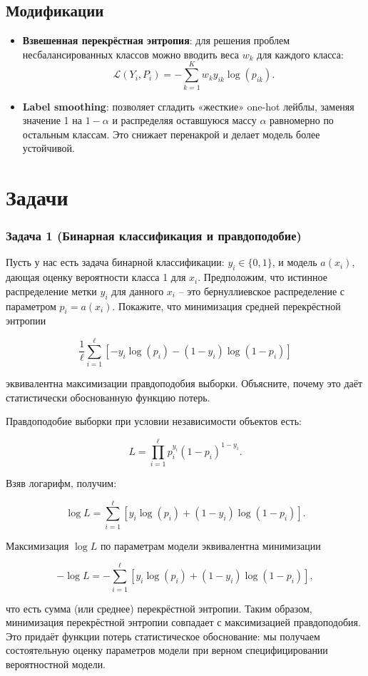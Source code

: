\subsection*{Модификации}

\begin{itemize}
    \item \textbf{Взвешенная перекрёстная энтропия}: для решения проблем несбалансированных классов можно вводить веса $w_k$ для каждого класса:
          $$
              \mathcal{L}(Y_i, P_i) = -\sum_{k=1}^{K} w_k y_{ik}\log(p_{ik}).
          $$

    \item \textbf{Label smoothing}: позволяет сгладить «жесткие» one-hot лейблы, заменяя значение 1 на $1-\alpha$ и распределяя оставшуюся массу $\alpha$ равномерно по остальным классам. Это снижает перенакрой и делает модель более устойчивой.
\end{itemize}

\newpage

\section*{Задачи}

\subsubsection*{Задача 1 (Бинарная классификация и правдоподобие)}

Пусть у нас есть задача бинарной классификации: $y_i \in \{0,1\}$, и модель $a(x_i)$, дающая оценку вероятности класса 1 для $x_i$. Предположим, что истинное распределение метки $y_i$ для данного $x_i$ – это бернуллиевское распределение с параметром $p_i = a(x_i)$. Покажите, что минимизация средней перекрёстной энтропии

$$
    \frac{1}{\ell}\sum_{i=1}^{\ell} \left[-y_i\log(p_i) - (1 - y_i)\log(1 - p_i)\right]
$$

эквивалентна максимизации правдоподобия выборки. Объясните, почему это даёт статистически обоснованную функцию потерь.

\begin{solution}
    Правдоподобие выборки при условии независимости объектов есть:

    $$
        L = \prod_{i=1}^{\ell} p_i^{y_i}(1 - p_i)^{1 - y_i}.
    $$

    Взяв логарифм, получим:

    $$
        \log L = \sum_{i=1}^{\ell} [y_i\log(p_i) + (1 - y_i)\log(1 - p_i)].
    $$

    Максимизация $\log L$ по параметрам модели эквивалентна минимизации

    $$
        -\log L = -\sum_{i=1}^{\ell} [y_i\log(p_i) + (1 - y_i)\log(1 - p_i)],
    $$

    что есть сумма (или среднее) перекрёстной энтропии. Таким образом, минимизация перекрёстной энтропии совпадает с максимизацией правдоподобия. Это придаёт функции потерь статистическое обоснование: мы получаем состоятельную оценку параметров модели при верном специфицировании вероятностной модели.
\end{solution}

